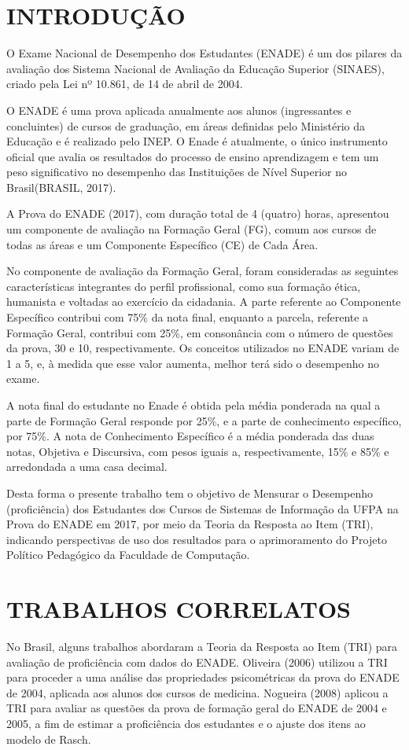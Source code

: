\documentclass[12pt]{article}
\begin{document}
\newpage
\section{INTRODUÇÃO}

O Exame Nacional de Desempenho dos Estudantes (ENADE) é um dos pilares da avaliação dos Sistema Nacional de Avaliação da Educação Superior (SINAES), criado pela Lei nº 10.861, de 14 de abril de 2004. 

O ENADE é uma prova aplicada anualmente aos alunos (ingressantes e concluintes) de cursos de graduação, em áreas definidas pelo Ministério da Educação e é realizado pelo INEP. O Enade é atualmente, o único instrumento oficial que avalia os resultados do processo de ensino aprendizagem e tem um peso significativo no desempenho das Instituições de Nível Superior no Brasil(BRASIL, 2017).

A Prova do ENADE (2017), com duração total de 4 (quatro) horas, apresentou um componente de avaliação na Formação Geral (FG), comum aos cursos de todas as áreas e um Componente Específico (CE) de Cada Área. 

No componente de avaliação da Formação Geral, foram consideradas as seguintes características integrantes do perfil profissional, como sua formação ética, humanista e voltadas ao exercício da cidadania. A parte referente ao Componente Específico contribui com 75\% da nota final, enquanto a parcela, referente a Formação Geral, contribui com 25\%, em consonância com o número de questões da prova, 30 e 10, respectivamente. Os conceitos utilizados no ENADE variam de 1 a 5, e, à medida que esse valor aumenta, melhor terá sido o desempenho no exame.

A nota final do estudante no Enade é obtida pela média ponderada na qual a parte de Formação Geral responde por 25\%, e a parte de conhecimento específico, por 75\%. A nota de Conhecimento Específico é a média ponderada das duas notas, Objetiva e Discursiva, com pesos iguais a, respectivamente, 15\% e 85\% e arredondada a uma casa decimal.

Desta forma o presente trabalho tem o objetivo de Mensurar o Desempenho (proficiência) dos Estudantes dos Cursos de Sistemas de Informação da UFPA na Prova do ENADE em 2017, por meio da Teoria da Resposta ao Item (TRI), indicando perspectivas de uso dos resultados para o aprimoramento do Projeto Político Pedagógico da Faculdade de Computação.


\section{TRABALHOS CORRELATOS} \label{sec:firstpage}
No Brasil, alguns trabalhos abordaram a Teoria da Resposta ao Item (TRI) para avaliação de proficiência com dados do ENADE. Oliveira (2006) utilizou a TRI para proceder a uma análise das propriedades psicométricas da prova do ENADE de 2004, aplicada aos alunos dos cursos de medicina. Nogueira (2008) aplicou a TRI para avaliar as questões da prova de formação geral do ENADE de 2004 e 2005, a fim de estimar a proficiência dos estudantes e o ajuste dos itens ao modelo de Rasch.
\end{document}

